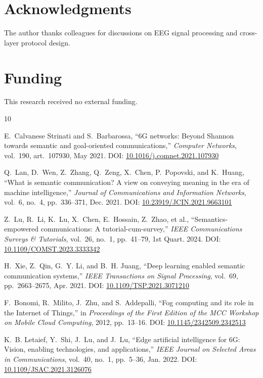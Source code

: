\documentclass[journal]{IEEEtran}
\begin{document}
\section*{Acknowledgments}
The author thanks colleagues for discussions on EEG signal processing and cross-layer protocol design.

\section*{Funding}
This research received no external funding.


\begin{thebibliography}{10}

E.~Calvanese Strinati and S.~Barbarossa, ``6G networks: Beyond Shannon towards semantic and goal-oriented communications,'' \emph{Computer Networks}, vol.~190, art.~107930, May 2021. DOI: \href{https://doi.org/10.1016/j.comnet.2021.107930}{10.1016/j.comnet.2021.107930}

Q.~Lan, D.~Wen, Z.~Zhang, Q.~Zeng, X.~Chen, P.~Popovski, and K.~Huang, ``What is semantic communication? A view on conveying meaning in the era of machine intelligence,'' \emph{Journal of Communications and Information Networks}, vol.~6, no.~4, pp.~336--371, Dec. 2021. DOI: \href{https://doi.org/10.23919/JCIN.2021.9663101}{10.23919/JCIN.2021.9663101}

Z.~Lu, R.~Li, K.~Lu, X.~Chen, E.~Hossain, Z.~Zhao, et al., ``Semantics-empowered communications: A tutorial-cum-survey,'' \emph{IEEE Communications Surveys \& Tutorials}, vol.~26, no.~1, pp.~41--79, 1st Quart. 2024. DOI: \href{https://doi.org/10.1109/COMST.2023.3333342}{10.1109/COMST.2023.3333342}

H.~Xie, Z.~Qin, G.~Y. Li, and B.~H. Juang, ``Deep learning enabled semantic communication systems,'' \emph{IEEE Transactions on Signal Processing}, vol.~69, pp.~2663--2675, Apr. 2021. DOI: \href{https://doi.org/10.1109/TSP.2021.3071210}{10.1109/TSP.2021.3071210}

F.~Bonomi, R.~Milito, J.~Zhu, and S.~Addepalli, ``Fog computing and its role in the Internet of Things,'' in \emph{Proceedings of the First Edition of the MCC Workshop on Mobile Cloud Computing}, 2012, pp.~13--16. DOI: \href{https://doi.org/10.1145/2342509.2342513}{10.1145/2342509.2342513}

K.~B. Letaief, Y.~Shi, J.~Lu, and J.~Lu, ``Edge artificial intelligence for 6G: Vision, enabling technologies, and applications,'' \emph{IEEE Journal on Selected Areas in Communications}, vol.~40, no.~1, pp.~5--36, Jan. 2022. DOI: \href{https://doi.org/10.1109/JSAC.2021.3126076}{10.1109/JSAC.2021.3126076}


\end{thebibliography}
\end{document}
